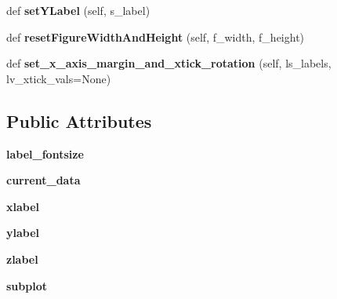 \begin{DoxyCompactItemize}
\item 
def {\bfseries set\+Y\+Label} (self, s\+\_\+label)\hypertarget{classnegui_1_1pgplottingframe_1_1PGPlottingFrame_a66aabf56246b307e993ac91f85779bdf}{}\label{classnegui_1_1pgplottingframe_1_1PGPlottingFrame_a66aabf56246b307e993ac91f85779bdf}

\item 
def {\bfseries reset\+Figure\+Width\+And\+Height} (self, f\+\_\+width, f\+\_\+height)\hypertarget{classnegui_1_1pgplottingframe_1_1PGPlottingFrame_a2317854f9580a750d1360c3bbb1e8328}{}\label{classnegui_1_1pgplottingframe_1_1PGPlottingFrame_a2317854f9580a750d1360c3bbb1e8328}

\item 
def {\bfseries set\+\_\+x\+\_\+axis\+\_\+margin\+\_\+and\+\_\+xtick\+\_\+rotation} (self, ls\+\_\+labels, lv\+\_\+xtick\+\_\+vals=None)\hypertarget{classnegui_1_1pgplottingframe_1_1PGPlottingFrame_ad4b621074fdb0a531e648de2fd42babc}{}\label{classnegui_1_1pgplottingframe_1_1PGPlottingFrame_ad4b621074fdb0a531e648de2fd42babc}

\end{DoxyCompactItemize}
\subsection*{Public Attributes}
\begin{DoxyCompactItemize}
\item 
{\bfseries label\+\_\+fontsize}\hypertarget{classnegui_1_1pgplottingframe_1_1PGPlottingFrame_a1ea349c633b3db59dc2891a449438374}{}\label{classnegui_1_1pgplottingframe_1_1PGPlottingFrame_a1ea349c633b3db59dc2891a449438374}

\item 
{\bfseries current\+\_\+data}\hypertarget{classnegui_1_1pgplottingframe_1_1PGPlottingFrame_af94a6c188cd4a4cb578130c366480d62}{}\label{classnegui_1_1pgplottingframe_1_1PGPlottingFrame_af94a6c188cd4a4cb578130c366480d62}

\item 
{\bfseries xlabel}\hypertarget{classnegui_1_1pgplottingframe_1_1PGPlottingFrame_a58f295cc95c3b704f42d73a7ee9e0ecc}{}\label{classnegui_1_1pgplottingframe_1_1PGPlottingFrame_a58f295cc95c3b704f42d73a7ee9e0ecc}

\item 
{\bfseries ylabel}\hypertarget{classnegui_1_1pgplottingframe_1_1PGPlottingFrame_a0f107b1b2523c8488daade7e06419781}{}\label{classnegui_1_1pgplottingframe_1_1PGPlottingFrame_a0f107b1b2523c8488daade7e06419781}

\item 
{\bfseries zlabel}\hypertarget{classnegui_1_1pgplottingframe_1_1PGPlottingFrame_a23f64d7fbb536daffce57b59d3804522}{}\label{classnegui_1_1pgplottingframe_1_1PGPlottingFrame_a23f64d7fbb536daffce57b59d3804522}

\item 
{\bfseries subplot}\hypertarget{classnegui_1_1pgplottingframe_1_1PGPlottingFrame_a19c6f21a229d2c84f957962595fc0b1e}{}\label{classnegui_1_1pgplottingframe_1_1PGPlottingFrame_a19c6f21a229d2c84f957962595fc0b1e}

\end{DoxyCompactItemize}


